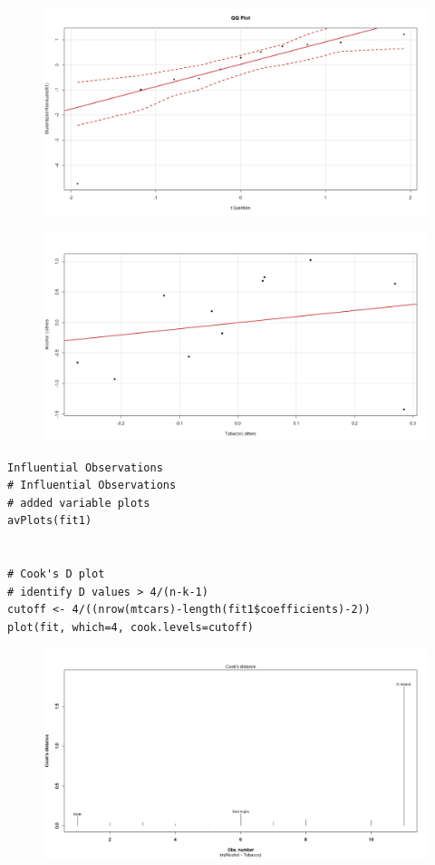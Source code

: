 \documentclass[residuals.tex]{subfiles}
\begin{document}
\begin{figure}
\centering
\includegraphics[width=1.2\linewidth]{alcotob3}
\end{figure}


\begin{figure}
	\centering
	\includegraphics[width=1.2\linewidth]{alcotob4}
\end{figure}






\newpage
\begin{framed}
	\begin{verbatim}
Influential Observations
# Influential Observations
# added variable plots 
avPlots(fit1)


# Cook's D plot
# identify D values > 4/(n-k-1) 
cutoff <- 4/((nrow(mtcars)-length(fit1$coefficients)-2)) 
plot(fit, which=4, cook.levels=cutoff)
 \end{verbatim}
\end{framed}
\begin{figure}
\centering
\includegraphics[width=0.7\linewidth]{alcotob6}
\caption{}
\label{fig:alcotob6}
\end{figure}
\end{document}
